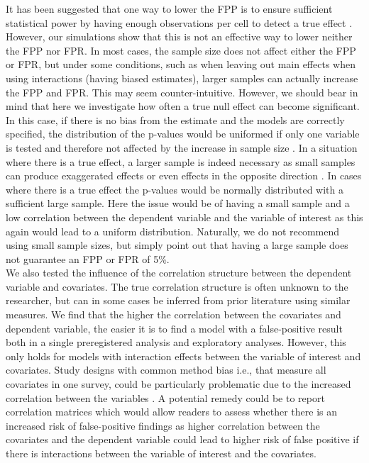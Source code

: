 It has been suggested that one way to lower the FPP is to ensure sufficient statistical power by having enough observations per cell to detect a true effect \citep{Simmons2011, simmons2018}. However, our simulations show that this is not an effective way to lower neither the FPP nor FPR. In most cases, the sample size does not affect either the FPP or FPR, but under some conditions, such as when leaving out main effects when using interactions (having biased estimates), larger samples can actually increase the FPP and FPR. This may seem counter-intuitive. However, we should bear in mind that here we investigate how often a true null effect can become significant. In this case, if there is no bias from the estimate and the models are correctly specified, the distribution of the p-values would be uniformed if only one variable is tested and therefore not affected by the increase in sample size \citep{Murdoch2008}. In a situation where there is a true effect, a larger sample is indeed necessary as small samples can produce exaggerated effects or even effects in the opposite direction \citep{gelman2014beyond}. In  cases where there is a true effect the p-values would be normally distributed with a sufficient large sample. Here the issue would be of having a small sample and a low correlation between the dependent variable and the variable of interest as this again would lead to a uniform distribution. Naturally, we do not recommend using small sample sizes, but simply point out that having a large sample does not guarantee an FPP or FPR of 5\%. \\

We also tested the influence of the correlation structure between the dependent variable and covariates. The true correlation structure is often unknown to the researcher, but can in some cases be inferred from prior literature using similar measures. We find that the higher the correlation between the covariates and dependent variable, the easier it is to find a model with a false-positive result both in a single preregistered analysis and exploratory analyses. However, this only holds for models with interaction effects between the variable of interest and covariates. Study designs with common method bias i.e., that measure all covariates in one survey, could be particularly problematic due to the increased correlation between the variables \citep{podsakoff2003}. A potential remedy could be to report correlation matrices which would allow readers to assess whether there is an increased risk of false-positive findings as higher correlation between the covariates and the dependent variable could lead to higher risk of false positive if there is interactions between the variable of interest and the covariates.  \\ 

